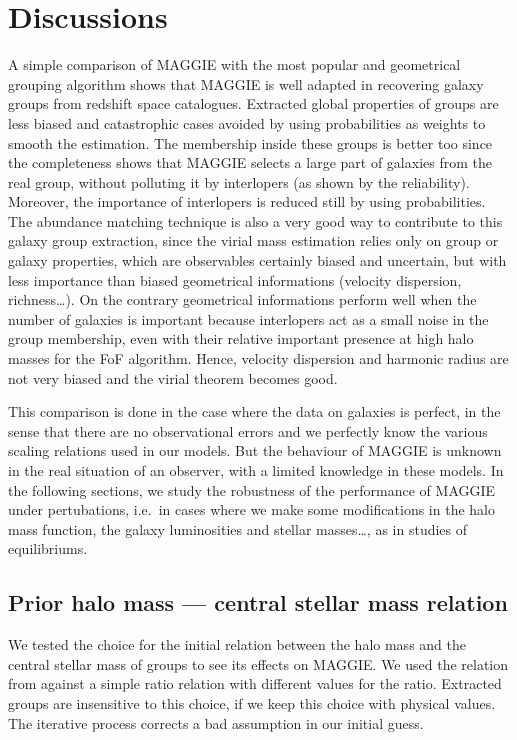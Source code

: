 \section{Discussions}
\label{sec:maggie_discussions}

A simple comparison of MAGGIE with the most popular and geometrical grouping
algorithm shows that MAGGIE is well adapted in recovering galaxy groups from
redshift space catalogues. Extracted global properties of groups are less
biased and catastrophic cases avoided by using probabilities as weights to
smooth the estimation. The membership inside these groups is better too since
the completeness shows that MAGGIE selects a large part of galaxies from the
real group, without polluting it by interlopers (as shown by the reliability).
Moreover, the importance of interlopers is reduced still by using
probabilities. The abundance matching technique is also a very good way to
contribute to this galaxy group extraction, since the virial mass estimation
relies only on group or galaxy properties, which are observables certainly
biased and uncertain, but with less importance than biased geometrical
informations (velocity dispersion, richness\ldots). On the contrary geometrical
informations perform well when the number of galaxies is important because
interlopers act as a small noise in the group membership, even with their
relative important presence at high halo masses for the FoF algorithm. Hence,
velocity dispersion and harmonic radius are not very biased and the virial
theorem becomes good.

This comparison is done in the case where the data on galaxies is perfect, in
the sense that there are no observational errors and we perfectly know the
various scaling relations used in our models. But the behaviour of MAGGIE is
unknown in the real situation of an observer, with a limited knowledge in these
models. In the following sections, we study the robustness of the performance
of MAGGIE under pertubations, i.e.\ in cases where we make some modifications
in the halo mass function, the galaxy luminosities and stellar masses\ldots, as
in studies of equilibriums.

\subsection{Prior halo mass --- central stellar mass relation}
\label{sub:prior_relation}

We tested the choice for the initial relation between the halo mass and the
central stellar mass of groups to see its effects on MAGGIE\@. We used the
relation from \citet{BCW+10} against a simple ratio relation with different
values for the ratio. Extracted groups are insensitive to this choice, if we
keep this choice with physical values. The iterative process corrects a bad
assumption in our initial guess.


